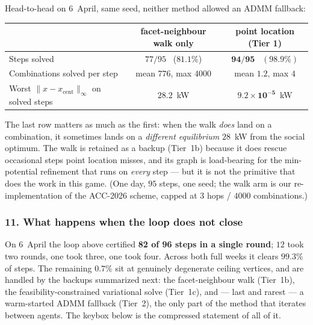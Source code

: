 \documentclass[11pt, letterpaper]{article}
\begin{document}
Head-to-head on 6~April, same seed, neither method allowed an ADMM fallback:
\begin{center}\small
\begin{tabular}{lcc}
\toprule
& facet-neighbour walk only & point location (Tier 1)\\
\midrule
Steps solved & $77/95$ \ ($81.1\%$) & $\mathbf{94/95}$ \ $(\mathbf{98.9\%})$\\
Combinations solved per step & mean $776$, max $4000$ & mean $\mathbf{1.2}$, max $4$\\
Worst $\lVert x-x_{\mathrm{cent}}\rVert_\infty$ on solved steps & $28.2$~kW & $\mathbf{9.2\times10^{-5}}$~kW\\
\bottomrule
\end{tabular}
\end{center}
The last row matters as much as the first: when the walk \emph{does} land on a combination, it
sometimes lands on a \emph{different equilibrium} $28$~kW from the social optimum. The walk is
retained as a backup (Tier~1b) because it does rescue occasional steps point location misses, and its
graph is load-bearing for the min-potential refinement that runs on \emph{every} step --- but it is
not the primitive that does the work in this game. (One day, $95$ steps, one seed; the walk arm is our
re-implementation of the ACC-2026 scheme, capped at 3 hops / $4000$ combinations.)

\subsubsection*{11. What happens when the loop does not close}
On 6~April the loop above certified \textbf{82 of 96 steps in a single round}; $12$ took two rounds,
one took three, one took four. Across both full weeks it clears $99.3\%$ of steps. The remaining
$0.7\%$ sit at genuinely degenerate ceiling vertices, and are handled by the backups summarized
next: the facet-neighbour walk (Tier~1b), the feasibility-constrained variational solve (Tier~1c),
and --- last and rarest --- a warm-started ADMM fallback (Tier~2), the only part of the method that
iterates between agents. The keybox below is the compressed statement of all of it.
\end{document}
